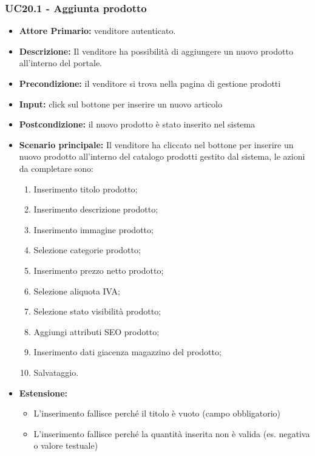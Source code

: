 \subsubsection{UC20.1 - Aggiunta prodotto}
\label{UC20.1}
\begin{itemize}
    \item \textbf{Attore Primario:}  venditore autenticato.
    \item \textbf{Descrizione:} Il venditore ha possibilità di aggiungere un nuovo prodotto all’interno del portale.
    \item \textbf{Precondizione:} il venditore si trova nella pagina di gestione prodotti
    \item \textbf{Input:} click sul bottone per inserire un nuovo articolo
    \item \textbf{Postcondizione:} il nuovo prodotto è stato inserito nel sistema
    \item \textbf{Scenario principale:} Il venditore ha cliccato nel bottone per inserire un nuovo prodotto all’interno del catalogo prodotti gestito dal sistema, le azioni da completare sono: 
    \begin{enumerate}
        \item Inserimento titolo prodotto;
        \item Inserimento descrizione prodotto;
        \item Inserimento immagine prodotto;
        \item Selezione categorie prodotto;
        \item Inserimento prezzo netto prodotto;
        \item Selezione aliquota IVA;
        \item Selezione stato visibilità prodotto; 
        \item Aggiungi attributi SEO prodotto;
        \item Inserimento dati giacenza magazzino del prodotto;
        \item Salvataggio.
    \end{enumerate}
    \item \textbf{Estensione:}
    \begin{itemize}
        \item L'inserimento fallisce perché il titolo è vuoto (campo obbligatorio) 
        \item L'inserimento fallisce perché la quantità inserita non è valida (es. negativa o valore testuale)
    \end{itemize}
\end{itemize}


